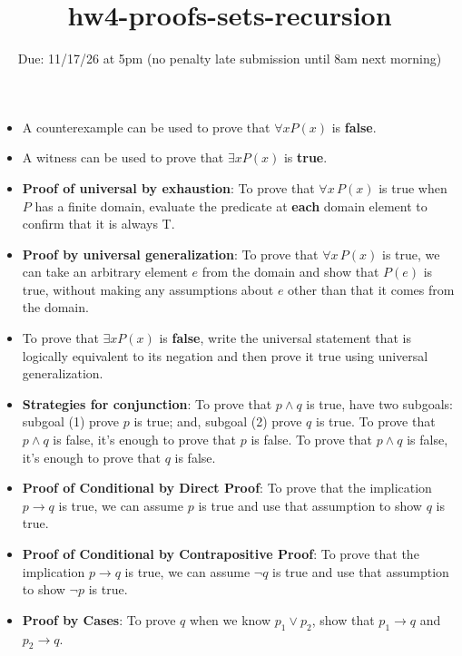 \begin{itemize}
    \item A counterexample can be used to prove that  $\forall x P(x)$ is {\bf false}.
    \item  A witness can be used  to  prove that  $\exists x P(x)$ is {\bf true}.
    \item {\bf Proof of universal by exhaustion}: To prove that $\forall x \, P(x)$
is true when $P$ has a finite domain, evaluate the predicate at {\bf each} domain element to confirm that it is always T.
    \item  {\bf Proof by universal generalization}: To prove that $\forall x \, P(x)$
is true, we can take an arbitrary element $e$ from the domain and show that $P(e)$ is true, without making any assumptions about $e$ other than that it comes from the domain.
    \item To  prove  that $\exists x P(x)$ is {\bf false}, write the universal statement that is logically equivalent to its negation and then prove it true using universal generalization.
    \item {\bf Strategies for conjunction}: To prove that $p \land q$ is true, have two subgoals: subgoal (1) prove $p$ 
is  true; and, subgoal (2) prove $q$ is true. To prove that $p \land q$ is false, it's enough to prove that $p$ is false.
 To prove that $p \land q$ is false, it's enough to prove that $q$ is false.
    \item {\bf Proof of Conditional by Direct Proof}: To prove that the implication $p \to q$ is true, we can assume $p$ is true and use that assumption to show $q$ is true.
    \item {\bf Proof of Conditional by Contrapositive Proof}: To prove that the implication $p \to q$ is true, we can assume $\neg q$ is true and use that assumption to show $\neg p$ is true.
    \item {\bf Proof by Cases}: To prove $q$ when we know $p_1 \lor p_2$, show that $p_1 \to q$ and $p_2 \to q$.
\end{itemize}



\newpage


\title{hw4-proofs-sets-recursion}
\date{Due: 11/17/26 at 5pm (no penalty late submission until 8am next morning)}

\maketitle
\thispagestyle{fancy}



